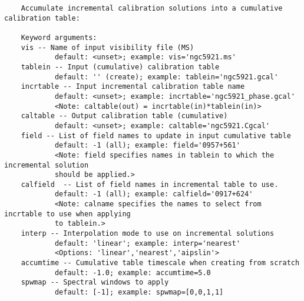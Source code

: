 \vspace{3mm}
\small
\begin{verbatim}
    Accumulate incremental calibration solutions into a cumulative calibration table:
    
    Keyword arguments:
    vis -- Name of input visibility file (MS)
            default: <unset>; example: vis='ngc5921.ms'
    tablein -- Input (cumulative) calibration table 
            default: '' (create); example: tablein='ngc5921.gcal'
    incrtable -- Input incremental calibration table name
            default: <unset>; example: incrtable='ngc5921_phase.gcal'
            <Note: caltable(out) = incrtable(in)*tablein(in)>
    caltable -- Output calibration table (cumulative)
            default: <unset>; example: caltable='ngc5921.Cgcal'
    field -- List of field names to update in input cumulative table 
            default: -1 (all); example: field='0957+561'
            <Note: field specifies names in tablein to which the incremental solution
            should be applied.>
    calfield  -- List of field names in incremental table to use.
            default: -1 (all); example: calfield='0917+624'
            <Note: calname specifies the names to select from incrtable to use when applying
            to tablein.>
    interp -- Interpolation mode to use on incremental solutions
            default: 'linear'; example: interp='nearest'
            <Options: 'linear','nearest','aipslin'>
    accumtime -- Cumulative table timescale when creating from scratch
            default: -1.0; example: accumtime=5.0
    spwmap -- Spectral windows to apply
            default: [-1]; example: spwmap=[0,0,1,1]
\end{verbatim}
\normalsize

